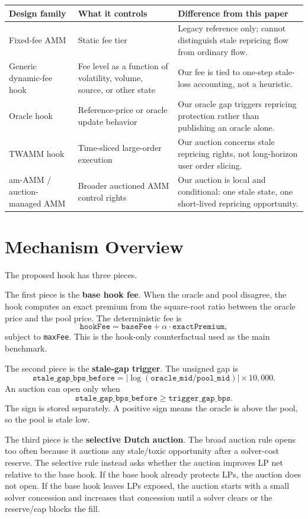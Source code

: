 \documentclass[11pt]{article}
\begin{document}
\begin{center}
\begin{tabular}{p{}p{}p{}}
\toprule
Design family & What it controls & Difference from this paper \\
\midrule
Fixed-fee AMM & Static fee tier & Legacy reference only; cannot distinguish stale repricing flow from ordinary flow. \\
Generic dynamic-fee hook & Fee level as a function of volatility, volume, source, or other state & Our fee is tied to one-step stale-loss accounting, not a heuristic. \\
Oracle hook & Reference-price or oracle update behavior & Our oracle gap triggers repricing protection rather than publishing an oracle alone. \\
TWAMM hook & Time-sliced large-order execution & Our auction concerns stale repricing rights, not long-horizon user order slicing. \\
am-AMM / auction-managed AMM & Broader auctioned AMM control rights & Our auction is local and conditional: one stale state, one short-lived repricing opportunity. \\
\bottomrule
\end{tabular}
\end{center}

\section{Mechanism Overview}
The proposed hook has three pieces.

The first piece is the \textbf{base hook fee}. When the oracle and pool disagree, the hook computes an exact premium from the square-root ratio between the oracle price and the pool price. The deterministic fee is
\[
\texttt{hookFee} = \texttt{baseFee} + \alpha \cdot \texttt{exactPremium},
\]
subject to \texttt{maxFee}. This is the hook-only counterfactual used as the main benchmark.

The second piece is the \textbf{stale-gap trigger}. The unsigned gap is
\[
\texttt{stale\_gap\_bps\_before}
= \left|\log(\texttt{oracle\_mid}/\texttt{pool\_mid})\right| \times 10{,}000.
\]
An auction can open only when
\[
\texttt{stale\_gap\_bps\_before} \geq \texttt{trigger\_gap\_bps}.
\]
The sign is stored separately. A positive sign means the oracle is above the pool, so the pool is stale low.

The third piece is the \textbf{selective Dutch auction}. The broad auction rule opens too often because it auctions any stale/toxic opportunity after a solver-cost reserve. The selective rule instead asks whether the auction improves LP net relative to the base hook. If the base hook already protects LPs, the auction does not open. If the base hook leaves LPs exposed, the auction starts with a small solver concession and increases that concession until a solver clears or the reserve/cap blocks the fill.
\end{document}
